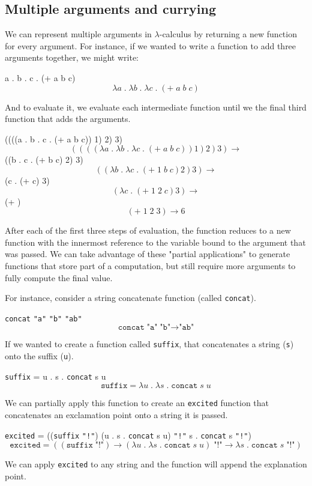 \documentclass{book}
\newcommand{\Scribtexttt}[1]{{\texttt{#1}}}
\newcommand{\Ssubsubsection}[2]{\subsubsection[#1]{#2}}
\def\texMathDisplay#1{\ifmmode #1\else\[#1\]\fi}%
\renewcommand{\Ssubsubsection}[2]{\subsection[#1]{#2}}
\begin{document}
\Ssubsubsection{Multiple arguments and currying}{Multiple arguments and currying}\label{t:x28part_x22Multiplex5fargumentsx5fandx5fcurryingx22x29}

We can represent multiple arguments in $\lambda${-}calculus by returning a new
function for every argument. For instance, if we wanted to write
a function to add three arguments together, we might write:

\texMathDisplay{\lambda a \; . \; \lambda b \; . \; \lambda c \; . \; (+ \; a \; b \; c)}

And to evaluate it, we evaluate each intermediate function until we the
final third function that adds the arguments.

\texMathDisplay{((((\lambda a \; . \; \lambda b \; . \; \lambda c \; . \; (+ \; a \; b \; c)) 1) 2) 3) \rightarrow}
\texMathDisplay{((\lambda b \; . \; \lambda c \; . \; (+  \; b \; c) 2) 3) \rightarrow}
\texMathDisplay{(\lambda c \; . \; (+ \; 1  \; c) 3) \rightarrow}
\texMathDisplay{(+  \; 2 ) }

After each of the first three steps of evaluation, the function reduces to
a new function with the innermost reference to the variable bound to the
argument that was passed. We can take advantage of these "partial
applications" to generate functions that store part of a computation, but
still require more arguments to fully compute the final value.

For instance, consider a string concatenate function (called \Scribtexttt{concat}).

\texMathDisplay{\texttt{concat} \; \texttt{"a"} \; \texttt{"b"} \rightarrow \texttt{"ab"}}

If we wanted to create a function called \Scribtexttt{suffix}, that concatenates
a string (\Scribtexttt{s}) onto the suffix (\Scribtexttt{u}).

\texMathDisplay{\texttt{suffix} = \lambda u \; . \; \lambda s \; . \; \texttt{concat} \; s \; u}

We can partially apply this function to create an \Scribtexttt{excited} function
that concatenates an exclamation point onto a string it is passed.

\texMathDisplay{\texttt{excited} = ((\texttt{suffix} \; \texttt{"!"}) \rightarrow (\lambda u \; . \; \lambda s \; . \;
\texttt{concat} \; s \; u) \; \texttt{"!"} \rightarrow \lambda s \; . \; \texttt{concat} \; s \; \texttt{"!"})}

We can apply \Scribtexttt{excited} to any string and the function will append the
explanation point.
\end{document}
